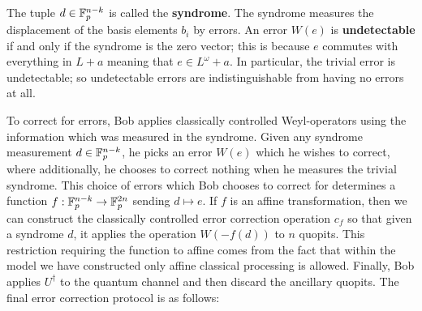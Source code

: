 The tuple $d \in \mathbb{F}_p^{n-k}$ is called the {\bf syndrome}. The syndrome measures the displacement of the basis elements $b_i$ by errors.
An error $W(e)$ is {\bf undetectable} if and only if the syndrome is the zero vector; this is because $e$ commutes with everything in $L+a$ meaning that $e \in L^\omega+a$.  In particular, the trivial error is undetectable; so undetectable errors are indistinguishable from having no errors at all.

To correct for errors,  Bob applies classically controlled Weyl-operators using the information which was measured in the syndrome.
Given any syndrome measurement $d\in \mathbb{F}_p^{n-k}$, he picks an error $W(e)$ which he wishes to correct, where additionally, he chooses to correct nothing when he  measures the trivial syndrome.  This choice of errors which Bob chooses to correct for determines a function $f:\mathbb{F}_p^{n-k}\to\mathbb{F}_p^{2n}$ sending $d\mapsto e$.
If $f$ is an affine transformation, then we can construct the classically controlled error correction operation $c_f$ so that given a syndrome $d$, it applies the operation $W(-f(d))$ to $n$ quopits.  This restriction requiring the function to affine comes from the fact that within the model we have constructed only affine classical processing is allowed. Finally, Bob applies  $U^\dag$  to the quantum channel and then discard the ancillary quopits. The final error correction protocol is as follows:
